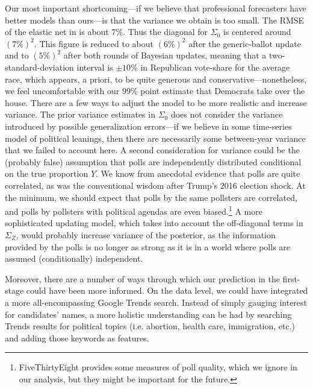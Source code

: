 \documentclass[12pt, letterpaper]{article}
\begin{document}
Our most important shortcoming---if we believe that professional forecasters have better models than ours---is that the variance we obtain is too small. The RMSE of the elastic net in  is about 7\%. Thus the diagonal for $\Sigma_0$ is centered around $(7\%)^2$. This figure is reduced to about $(6\%)^2$ after the generic-ballot update and to $(5\%)^2$ after both rounds of Bayesian updates, meaning that a two-standard-deviation interval is $\pm 10\%$ in Republican vote-share for the average race, which appears, a priori, to be quite generous and conservative---nonetheless, we feel uncomfortable with our $99\%$ point estimate that Democrats take over the house. There are a few ways to adjust the model to be more realistic and increase variance. The prior variance estimates in $\Sigma_0$ does not consider the variance introduced by possible generalization errors---if we believe in some time-series model of political leanings, then there are necessarily some between-year variance that we failed to account here. A second consideration for variance could be the (probably false) assumption that polls are independently distributed conditional on the true proportion $Y$. We know from anecdotal evidence that polls are quite correlated, as was the conventional wisdom after Trump's 2016 election shock. At the minimum, we should expect that polls by the same pollsters are correlated, and polls by pollsters with political agendas are even biased.\footnote{FiveThirtyEight provides some measures of poll quality, which we ignore in our analysis, but they might be important for the future.} A  
more sophisticated updating model, which takes into account the off-diagonal terms in $\Sigma_Z$, would probably increase variance of the posterior, as the information provided by the polls is no longer as strong as it is in a world where polls are assumed (conditionally) independent.

Moreover, there are a number of ways through which our prediction in the first-stage could have been more informed. On the data level, we could have integrated a more all-encompassing Google Trends search. Instead of simply gauging interest for candidates' names, a more holistic understanding can be had by searching Trends results for political topics (i.e. abortion, health care, immigration, etc.) and adding those keywords as features.
\end{document}
